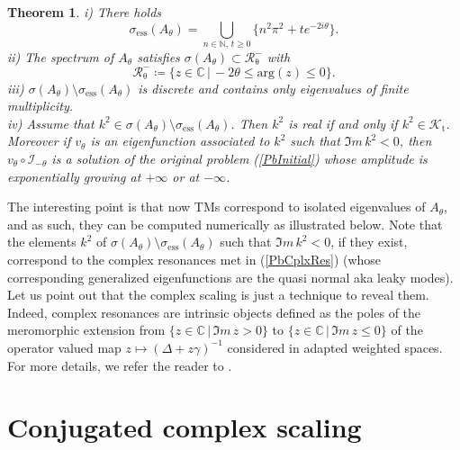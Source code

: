 \documentclass[11pt,a4paper]{report}
\newcommand{\mrm}[1]{\mathrm{#1}}
\newcommand{\Cplx}{\mathbb{C}}
\newcommand{\N}{\mathbb{N}}
\newtheorem{theorem}{Theorem}[chapter]
\begin{document}
\begin{theorem}\label{thmUsualPMLs}
i) There holds
\begin{equation}\label{essClassicalPMLs}
\sigma_{\mrm{ess}}(A_{\theta})=\bigcup_{n\in\N,\,t\ge0}\{n^2\pi^2+te^{-2i\theta}\}.
\end{equation}
ii)  The spectrum of $A_{\theta}$ satisfies $\sigma(A_{\theta})\subset\mathscr{R}_{\mrm{\theta}}^-$ with 
\[
\mathscr{R}_{\mrm{\theta}}^-\coloneqq\{z\in\Cplx\,|\,-2\theta\le\mrm{arg}(z)\le 0\}.
\]
iii)  $\sigma (A_{\theta})\setminus \sigma_{\mrm{ess}}(A_{\theta})$ is discrete and contains only eigenvalues of finite multiplicity.\\[3pt]
iv) Assume that $k^2\in\sigma(A_{\theta})\setminus\sigma_{\mrm{ess}}(A_{\theta})$. Then $k^2$ is real if and only if $k^2\in\mathscr{K}_{\mrm{t}}$. Moreover if $v_{\theta} $ is an eigenfunction associated to $k^2$ such that $\Im m\,k^2<0$, then $v_{\theta}\circ\mathcal{I}_{-\theta}$ is a solution of the original problem (\ref{PbInitial}) whose amplitude is exponentially growing at $+\infty$ or at $-\infty$.
\end{theorem} 
\noindent The interesting point is that now TMs correspond to isolated eigenvalues of $A_{\theta}$, and as such, they can be computed numerically as illustrated below. Note that the elements $k^2$ of $\sigma(A_{\theta})\setminus\sigma_{\mrm{ess}}(A_{\theta})$ such that $\Im m\,k^2<0$, if they exist, correspond to the complex resonances met in (\ref{PbCplxRes}) (whose corresponding generalized eigenfunctions are the quasi normal aka leaky modes). Let us point out that the complex scaling is just a technique to reveal them. Indeed, complex resonances are intrinsic objects defined as the poles of the meromorphic extension from $\{z\in\Cplx\,|\,\Im m\,z>0\}$ to $\{z\in\Cplx\,|\,\Im m\,z\le0\}$ of the operator valued map $z\mapsto (\Delta +z\gamma)^{-1}$ considered in adapted weighted spaces. For more details, we refer the reader to \cite{AsPV00}.



\section{Conjugated complex scaling}\label{SectionUnusual}
\end{document}
